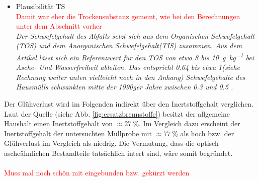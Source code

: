 \begin{itemize}	
	\item Plausibilität TS\\ 
	\textcolor{red}{Damit war eher die Trockensubstanz gemeint, wie bei den Berechnungen  unter dem Abschnitt vorher}\\
	\textit{Der Schwefelgehalt des Abfalls setzt sich aus dem Organischen Schwefelgehalt (TOS) und dem Anorganischen Schwefelgehalt(TIS) zusammen. Aus dem Artikel \cite{Schwarzboeck2018} lässt sich ein Referenzwert für den TOS von etwa 8 bis \SI{10}{\gram\per\kilogram} bei Asche- Und Wasserfreiheit ableiten. Das entspricht \SI{0,64}{\mpercent} bis etwa \SI{1}{\mpercent}(siehe Rechnung weiter unten vielleicht noch in den Anhang)
		Schwefelgehalte des Hausmülls schwankten mitte der 1990ger Jahre zwischen \SI{0,3}{\mpercent} und \SI{0,5}{\mpercent} \cite{scholz2013}.}	
\end{itemize}
Der Glühverlust wird im Folgenden indirekt über den Inertstoffgehalt verglichen. Laut der Quelle (siehe Abb. \ref{fig:ersatzbrennstoffe}) besitzt der allgemeine Haushalt einen Inertstoffgehalt von $\approx \SI{27}{\percent}$. Im Vergleich dazu erscheint der Inertstoffgehalt der untersuchten Müllprobe mit $\approx \SI{77}{\percent}$ als hoch bzw. der Glühverlust im Vergleich als niedrig. Die Vermutung, dass die optisch ascheähnlichen Bestandteile tatsächlich intert sind, wäre somit begründet.\\ \\
\textcolor{red}{Muss mal noch schön mit eingebunden bzw. gekürzt werden}\\
